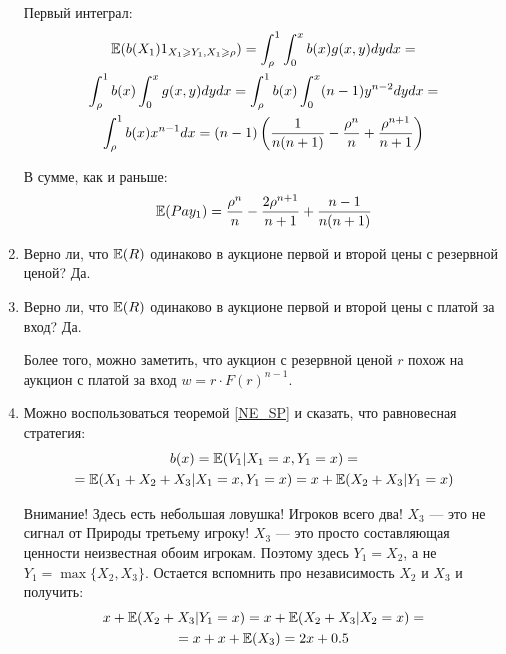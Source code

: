 \begin{enumerate}
Первый интеграл:
\begin{multline}
\mathbb{E}(b(X_{1})1_{X_{1}\geqslant Y_{1},X_{1}\geqslant \rho})=\int_{\rho}^{1} \int_{0}^{x} b(x)g(x,y)dy dx =\\
\int_{\rho}^{1} b(x) \int_{0}^{x} g(x,y)dy dx =\int_{\rho}^{1} b(x) \int_{0}^{x} (n-1) y^{n-2} dy dx =\\
\int_{\rho}^{1}b(x) x^{n-1} dx=(n-1)\left(\frac{1}{n(n+1)}-\frac{\rho^{n}}{n}+\frac{\rho^{n+1}}{n+1}\right)
\end{multline}

В сумме, как и раньше:
\begin{equation}
\mathbb{E}(Pay_{1})=\frac{\rho^{n}}{n}-\frac{2\rho^{n+1}}{n+1}+\frac{n-1}{n(n+1)}
\end{equation}

\item  Верно ли, что $ \mathbb{E}(R) $ одинаково в аукционе первой и второй цены с резервной ценой? Да.

\item  Верно ли, что $ \mathbb{E}(R) $ одинаково в аукционе первой и второй цены с платой за вход? Да.

Более того, можно заметить, что аукцион с резервной ценой $ r $ похож на аукцион с платой за вход $ w=r\cdot F(r)^{n-1} $.

\item %
Можно воспользоваться теоремой \ref{NE_SP} и сказать, что равновесная стратегия:
\begin{multline}
b(x)=\mathbb{E}(V_{1}|X_{1}=x,Y_{1}=x)=\\
=\mathbb{E}(X_{1}+X_{2}+X_{3}|X_{1}=x,Y_{1}=x)=x+\mathbb{E}(X_{2}+X_{3}|Y_{1}=x)
\end{multline}

Внимание! Здесь есть небольшая ловушка! Игроков всего два! $ X_{3} $ --- это не сигнал от Природы третьему игроку! $ X_{3} $ --- это просто составляющая ценности неизвестная обоим игрокам. Поэтому здесь $ Y_{1}=X_{2} $, а не $ Y_{1}=\max\{X_{2},X_{3}\} $. Остается вспомнить про независимость $ X_{2} $ и $ X_{3} $ и получить:
\begin{multline}
x+\mathbb{E}(X_{2}+X_{3}|Y_{1}=x)=x+\mathbb{E}(X_{2}+X_{3}|X_{2}=x)=\\
=x+x+\mathbb{E}(X_{3})=2x+0.5
\end{multline}


\end{enumerate}
